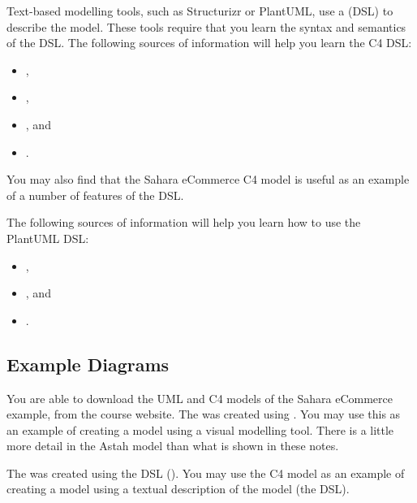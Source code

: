 Text-based modelling tools, such as Structurizr or PlantUML, use a
 (DSL) to describe the model.
These tools require that you learn the syntax and semantics of the DSL.
The following sources of information will help you learn the C4 DSL:
\begin{itemize}[nosep]
    \item {},
    \item {}, 
    \item {}, and
    \item {}.
\end{itemize}
You may also find that the Sahara eCommerce C4 model is useful as an example of a number of features of the DSL.

The following sources of information will help you learn how to use the PlantUML DSL:
\begin{itemize}[nosep]
    \item {},
    \item {}, and
    \item {}.
\end{itemize}

\subsection{Example Diagrams}
You are able to download the UML and C4 models of the Sahara eCommerce example, from the course website.
The 
was created using .
You may use this as an example of creating a model using a visual modelling tool.
There is a little more detail in the Astah model than what is shown in these notes.

The 
was created using the  DSL
().
You may use the C4 model as an example of creating a model using a textual description of the model (the DSL).
